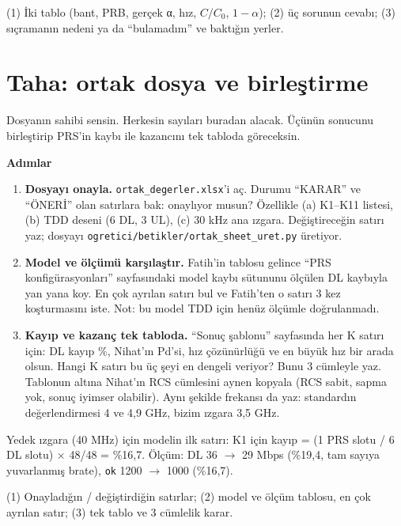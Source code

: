 \documentclass[11pt,a4paper]{article}
\begin{document}
\begin{teslim}
(1) İki tablo (bant, PRB, gerçek α, hız, $C/C_0$, $1 - \alpha$); (2) üç sorunun cevabı; (3) sıçramanın nedeni ya da ``bulamadım'' ve baktığın yerler.
\end{teslim}

\clearpage
\section*{Taha: ortak dosya ve birleştirme}
\begin{amac}
Dosyanın sahibi sensin. Herkesin sayıları buradan alacak. Üçünün sonucunu birleştirip PRS'in kaybı ile kazancını tek tabloda göreceksin.
\end{amac}

\textbf{Adımlar}
\begin{enumerate}[leftmargin=1.6em]
\item \textbf{Dosyayı onayla.} \texttt{ortak\_degerler.xlsx}'i aç. Durumu ``KARAR'' ve ``ÖNERİ'' olan satırlara bak: onaylıyor musun? Özellikle (a) K1--K11 listesi, (b) TDD deseni (6 DL, 3 UL), (c) 30 kHz ana ızgara. Değiştireceğin satırı yaz; dosyayı \texttt{ogretici/betikler/ortak\_sheet\_uret.py} üretiyor.
\item \textbf{Model ve ölçümü karşılaştır.} Fatih'in tablosu gelince ``PRS konfigürasyonları'' sayfasındaki model kaybı sütununu ölçülen DL kaybıyla yan yana koy. En çok ayrılan satırı bul ve Fatih'ten o satırı 3 kez koşturmasını iste. Not: bu model TDD için henüz ölçümle doğrulanmadı.
\item \textbf{Kayıp ve kazanç tek tabloda.} ``Sonuç şablonu'' sayfasında her K satırı için: DL kayıp \%, Nihat'ın Pd'si, hız çözünürlüğü ve en büyük hız bir arada olsun. Hangi K satırı bu üç şeyi en dengeli veriyor? Bunu 3 cümleyle yaz. Tablonun altına Nihat'ın RCS cümlesini aynen kopyala (RCS sabit, sapma yok, sonuç iyimser olabilir). Aynı şekilde frekansı da yaz: standardın değerlendirmesi 4 ve 4,9 GHz, bizim ızgara 3,5 GHz.
\end{enumerate}

\begin{kontrol}
Yedek ızgara (40 MHz) için modelin ilk satırı: K1 için kayıp = (1 PRS slotu / 6 DL slotu) $\times$ 48/48 = \%16,7. Ölçüm: DL 36 $\rightarrow$ 29 Mbps (\%19,4, tam sayıya yuvarlanmış brate), \texttt{ok} 1200 $\rightarrow$ 1000 (\%16,7).
\end{kontrol}

\begin{teslim}
(1) Onayladığın / değiştirdiğin satırlar; (2) model ve ölçüm tablosu, en çok ayrılan satır; (3) tek tablo ve 3 cümlelik karar.
\end{teslim}
\end{document}

